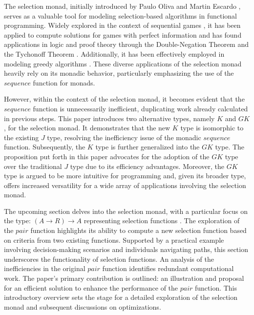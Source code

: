 \documentclass[runningheads]{llncs}
\begin{document}
The selection monad, initially introduced by Paulo Oliva and Martin
Escardo \cite{escardo2010selection}, serves as a valuable tool for
modeling selection-based algorithms in functional programming. Widely
explored in the context of sequential games
\cite{escardo2010sequential}, it has been applied to compute solutions
for games with perfect information and has found applications in logic
and proof theory through the Double-Negation Theorem and the Tychonoff
Theorem \cite{escardo2010sequential}. Additionally, it has been
effectively employed in modeling greedy algorithms
\cite{hartmann2021greedyselection}. These diverse applications of the
selection monad heavily rely on its monadic behavior, particularly
emphasizing the use of the \(sequence\) function for monads.

However, within the context of the selection monad, it becomes evident
that the \(sequence\) function is unnecessarily inefficient, duplicating
work already calculated in previous steps. This paper introduces two
alternative types, namely \(K\) and \(GK\), for the selection monad. It
demonstrates that the new \(K\) type is isomorphic to the existing \(J\)
type, resolving the inefficiency issue of the monadic \(sequence\)
function. Subsequently, the \(K\) type is further generalized into the
\(GK\) type. The proposition put forth in this paper advocates for the
adoption of the \(GK\) type over the traditional \(J\) type due to its
efficiency advantages. Moreover, the \(GK\) type is argued to be more
intuitive for programming and, given its broader type, offers increased
versatility for a wide array of applications involving the selection
monad.

The upcoming section delves into the selection monad, with a particular
focus on the type: \((A \rightarrow R) \rightarrow A\) representing
selection functions \cite{escardo2010selection}. The exploration of the
\(pair\) function highlights its ability to compute a new selection
function based on criteria from two existing functions. Supported by a
practical example involving decision-making scenarios and individuals
navigating paths, this section underscores the functionality of
selection functions. An analysis of the inefficiencies in the original
\(pair\) function identifies redundant computational work. The paper's
primary contribution is outlined: an illustration and proposal for an
efficient solution to enhance the performance of the \(pair\) function.
This introductory overview sets the stage for a detailed exploration of
the selection monad and subsequent discussions on optimizations.
\end{document}
